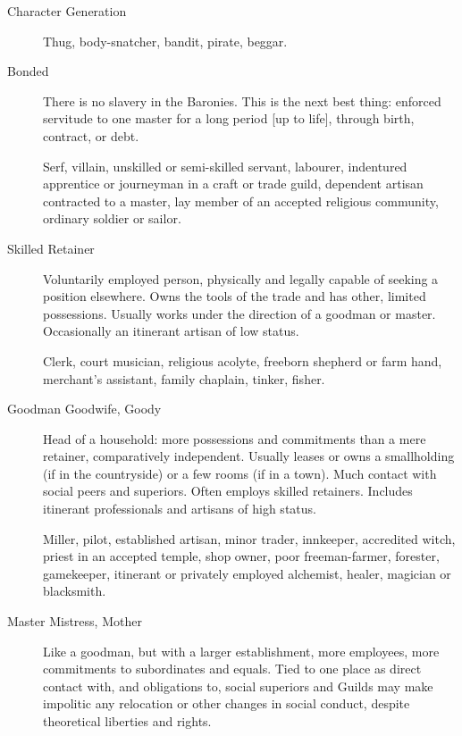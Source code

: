 \begin{Chapter}{Character Generation}
\begin{description}
  \begin{example}
    Thug, body-snatcher, bandit, pirate, beggar.
  \end{example}

\item[Bonded] There is no slavery in the Baronies. This is the next
  best thing: enforced servitude to one master for a long period [up
    to life], through birth, contract, or debt.
  
  \begin{example}
    Serf, villain, unskilled or semi-skilled servant, labourer,
    indentured apprentice or journeyman in a craft or trade guild,
    dependent artisan contracted to a master, lay member of an
    accepted religious community, ordinary soldier or sailor.
  \end{example}

\item[Skilled Retainer] Voluntarily employed person, physically and
  legally capable of seeking a position elsewhere.  Owns the tools of
  the trade and has other, limited possessions. Usually works under
  the direction of a goodman or master. Occasionally an itinerant
  artisan of low status.

  \begin{example}
    Clerk, court musician, religious acolyte, freeborn shepherd or
    farm hand, merchant’s assistant, family chaplain, tinker, fisher.
  \end{example}

\item[Goodman \lbrack Goodwife, Goody\rbrack] Head of a household:
  more possessions and commitments than a mere retainer, comparatively
  independent.  Usually leases or owns a smallholding (if in the
  countryside) or a few rooms (if in a town).  Much contact with
  social peers and superiors.  Often employs skilled retainers.
  Includes itinerant professionals and artisans of high status.

    \begin{example} 
      Miller, pilot, established artisan, minor trader, innkeeper,
      accredited witch, priest in an accepted temple, shop owner, poor
      freeman-farmer, forester, gamekeeper, itinerant or privately
      employed alchemist, healer, magician or blacksmith.
    \end{example}
    
\item[Master \lbrack Mistress, Mother\rbrack] Like a goodman, but with
  a larger establishment, more employees, more commitments to
  subordinates and equals.  Tied to one place as direct contact with,
  and obligations to, social superiors and Guilds may make impolitic
  any relocation or other changes in social conduct, despite
  theoretical liberties and rights.


\end{description}
\end{Chapter}
